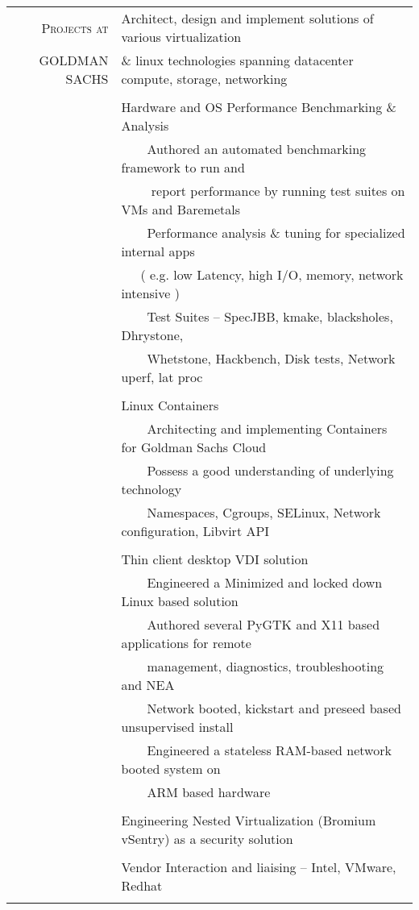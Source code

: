 \documentclass[a4paper,10pt]{article} %
\newcommand{\tabitem}{~~\llap{\textbullet}~~}
\begin{document}
\begin{tabular}{rp{12cm}}
	\textsc{Projects at}  &  Architect, design and implement solutions of various virtualization \\
	\textsc{GOLDMAN SACHS} &   \& linux technologies spanning datacenter compute, storage, networking \\
	&\\
	& Hardware and OS Performance Benchmarking \& Analysis\\
	& \tabitem Authored an automated benchmarking framework to run and \\
	& ~~~~ report performance by running test suites on VMs and Baremetals\\
	& \tabitem Performance analysis \& tuning for specialized internal apps \\
	& ~~~( e.g. low Latency, high I/O, memory, network intensive )\\
	& \tabitem Test Suites – SpecJBB, kmake, blacksholes, Dhrystone, \\
	& ~~~~Whetstone, Hackbench, Disk tests, Network uperf, lat proc \\
	&\\
	& Linux Containers\\
	& \tabitem Architecting and implementing Containers for Goldman Sachs Cloud \\
	& \tabitem Possess a good understanding of underlying technology \\
	& ~~~~Namespaces, Cgroups, SELinux, Network configuration, Libvirt API \\
	&\\
	& Thin client desktop VDI solution\\
	& \tabitem Engineered a Minimized and locked down Linux based solution \\
	& \tabitem Authored several PyGTK and X11 based applications for remote \\
	& ~~~~management, diagnostics, troubleshooting and NEA \\
	& \tabitem Network booted, kickstart and preseed based unsupervised install \\
	& \tabitem Engineered a stateless RAM-based network booted system on\\ & ~~~~ARM based hardware\\
	&\\
	& Engineering Nested Virtualization (Bromium vSentry) as a security solution\\
	& \\
	& Vendor Interaction and liaising – Intel, VMware, Redhat \\
	&\\
\end{tabular}
\end{document}
